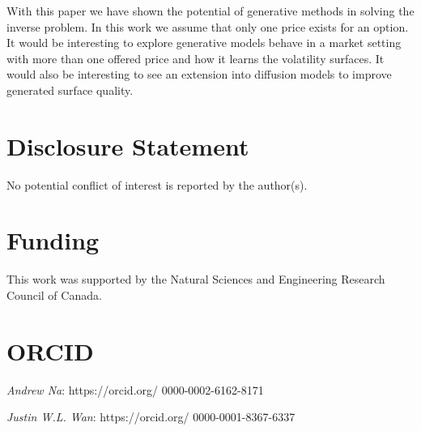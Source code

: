 \documentclass{article}
\theoremstyle{plain}%
\theoremstyle{definition}
\theoremstyle{remark}
\begin{document}
With this paper we have shown the potential of generative methods in solving the inverse problem. In this work we assume that only one price exists for an option. It would be interesting to explore generative models behave in a market setting with more than one offered price and how it learns the volatility surfaces. It would also be interesting to see an extension into diffusion models to improve generated surface quality.

\section*{Disclosure Statement}
No potential conflict of interest is reported by the author(s).

\section*{Funding}
This work was supported by the Natural Sciences and Engineering Research Council of Canada.

\section*{ORCID}
\begin{description}
\item \textit{Andrew Na}: https://orcid.org/
0000-0002-6162-8171
\item \textit{Justin W.L. Wan}: https://orcid.org/
0000-0001-8367-6337
\end{description}




\end{document}
